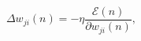 \begin{equation}
\label{eq:deltaweight}
\Delta w_{ji}(n) = -\eta \frac{\mathscr{E}(n)}{\partial \mathit{w}_{ji}(n)},
\end{equation}
